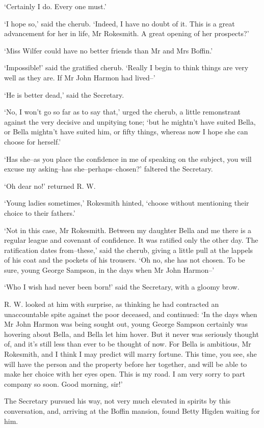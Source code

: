 ‘Certainly I do. Every one must.’

‘I hope so,’ said the cherub. ‘Indeed, I have no doubt of it. This is a
great advancement for her in life, Mr Rokesmith. A great opening of her
prospects?’

‘Miss Wilfer could have no better friends than Mr and Mrs Boffin.’

‘Impossible!’ said the gratified cherub. ‘Really I begin to think things
are very well as they are. If Mr John Harmon had lived--’

‘He is better dead,’ said the Secretary.

‘No, I won’t go so far as to say that,’ urged the cherub, a little
remonstrant against the very decisive and unpitying tone; ‘but he
mightn’t have suited Bella, or Bella mightn’t have suited him, or fifty
things, whereas now I hope she can choose for herself.’

‘Has she--as you place the confidence in me of speaking on the subject,
you will excuse my asking--has she--perhaps--chosen?’ faltered the
Secretary.

‘Oh dear no!’ returned R. W.

‘Young ladies sometimes,’ Rokesmith hinted, ‘choose without mentioning
their choice to their fathers.’

‘Not in this case, Mr Rokesmith. Between my daughter Bella and me there
is a regular league and covenant of confidence. It was ratified only the
other day. The ratification dates from--these,’ said the cherub,
giving a little pull at the lappels of his coat and the pockets of his
trousers. ‘Oh no, she has not chosen. To be sure, young George Sampson,
in the days when Mr John Harmon--’

‘Who I wish had never been born!’ said the Secretary, with a gloomy
brow.

R. W. looked at him with surprise, as thinking he had contracted an
unaccountable spite against the poor deceased, and continued: ‘In the
days when Mr John Harmon was being sought out, young George Sampson
certainly was hovering about Bella, and Bella let him hover. But it
never was seriously thought of, and it’s still less than ever to be
thought of now. For Bella is ambitious, Mr Rokesmith, and I think I may
predict will marry fortune. This time, you see, she will have the person
and the property before her together, and will be able to make her
choice with her eyes open. This is my road. I am very sorry to part
company so soon. Good morning, sir!’

The Secretary pursued his way, not very much elevated in spirits by this
conversation, and, arriving at the Boffin mansion, found Betty Higden
waiting for him.

